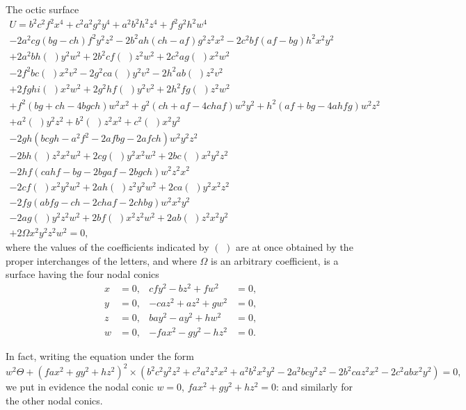 \documentclass[11pt,a4paper]{book}
\begin{document}
The octic surface
%
\begin{multline}
U = b^{2}c^{2}f^{2}x^{4} + c^{2}a^{2}g^{2}y^{4} + a^{2}b^{2}h^{2}z^{4} + f^{2}g^{2}h^{2}w^{4} \\
- 2a^{2}cg(bg - ch)f^{2}y^{2}z^{2} - 2b^{2}ah(ch - af)g^{2}z^{2}x^{2} - 2c^{2}bf(af - bg)h^{2}x^{2}y^{2} \\
+ 2a^{2}bh(\,\,)y^{2}w^{2} + 2b^{2}cf(\,\,)z^{2}w^{2} + 2c^{2}ag(\,\,)x^{2}w^{2} \\
- 2f^{2}bc(\,\,)x^{2}v^{2} - 2g^{2}ca(\,\,)y^{2}v^{2} - 2h^{2}ab(\,\,)z^{2}v^{2} \\
+ 2fghi(\,\,)x^{2}w^{2} + 2g^{2}hf(\,\,)y^{2}v^{2} + 2h^{2}fg(\,\,)z^{2}w^{2} \\
+ f^{2}(bg + ch - 4bgch)w^{2}x^{2} + g^{2}(ch + af - 4chaf)w^{2}y^{2} + h^{2}(af + bg - 4ahfg)w^{2}z^{2} \\
+ a^{2}(\,\,)y^{2}z^{2} + b^{2}(\,\,)z^{2}x^{2} + c^{2}(\,\,)x^{2}y^{2} \\
- 2gh(bcgh - a^{2}f^{2} - 2afbg - 2afch)w^{2}y^{2}z^{2} \\
- 2bh(\,\,)z^{2}x^{2}w^{2} + 2cg(\,\,)y^{2}x^{2}w^{2} + 2bc(\,\,)x^{2}y^{2}z^{2} \\
- 2hf(cahf - bg - 2bgaf - 2bgch)w^{2}z^{2}x^{2} \\
- 2cf(\,\,)x^{2}y^{2}w^{2} + 2ah(\,\,)z^{2}y^{2}w^{2} + 2ca(\,\,)y^{2}x^{2}z^{2} \\
- 2fg(abfg - ch - 2chaf - 2chbg)w^{2}x^{2}y^{2} \\
- 2ag(\,\,)y^{2}z^{2}w^{2} + 2bf(\,\,)x^{2}z^{2}w^{2} + 2ab(\,\,)z^{2}x^{2}y^{2} \\
+ 2\Omega x^{2}y^{2}z^{2}w^{2} = 0,
\end{multline}
%
where the values of the coefficients indicated by $(\,\,)$ are at once obtained by the proper interchanges of the letters, and where $\Omega$ is an arbitrary coefficient, is a surface having the four nodal conics
\begin{align*}
x&=0, & cf y^{2} - bz^{2} + fw^{2} &= 0, \\
y&=0, & -ca z^{2} + az^{2} + gw^{2} &= 0, \\
z&=0, & ba y^{2} - ay^{2} + hw^{2} &= 0, \\
w&=0, & -fax^{2} - gy^{2} - hz^{2} &= 0.
\end{align*}

\newpage
\setcounter{page}{103}

In fact, writing the equation under the form
\[
w^{2}\Theta + (fax^{2} + gy^{2} + hz^{2})^{2} \times (b^{2}c^{2}y^{2}z^{2} + c^{2}a^{2}z^{2}x^{2} + a^{2}b^{2}x^{2}y^{2} - 2a^{2}bc y^{2}z^{2} - 2b^{2}ca z^{2}x^{2} - 2c^{2}ab x^{2}y^{2}) = 0,
\]
we put in evidence the nodal conic $w = 0$, $fax^{2} + gy^{2} + hz^{2} = 0$: and similarly for the other nodal conics.
\end{document}
